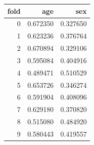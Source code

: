 \begin{tabular}{rrr}
\toprule
fold & age & sex \\
\midrule
0 & 0.672350 & 0.327650 \\
1 & 0.623236 & 0.376764 \\
2 & 0.670894 & 0.329106 \\
3 & 0.595084 & 0.404916 \\
4 & 0.489471 & 0.510529 \\
5 & 0.653726 & 0.346274 \\
6 & 0.591904 & 0.408096 \\
7 & 0.629180 & 0.370820 \\
8 & 0.515080 & 0.484920 \\
9 & 0.580443 & 0.419557 \\
\bottomrule
\end{tabular}
